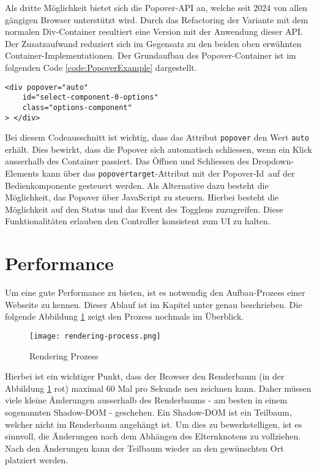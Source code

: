 Als dritte Möglichkeit bietet sich die Popover-API an, welche seit 2024 von allen gängigen Browser unterstützt wird.
Durch das Refactoring der Variante mit dem normalen Div-Container resultiert eine Version mit der Anwendung dieser API.
Der Zusatzaufwand reduziert sich im Gegensatz zu den beiden oben erwähnten Container-Implementationen.
Der Grundaufbau des Popover-Container ist im folgenden Code \ref{code:PopoverExample} dargestellt.

\begin{lstlisting}[style = htmlcssjs, caption = Popover-Container Beispiel, label = code:PopoverExample]
<div popover="auto"
    id="select-component-0-options" 
    class="options-component" 
> </div>
\end{lstlisting}

Bei diesem Codeausschnitt ist wichtig, dass das Attribut \texttt{popover} den Wert \texttt{auto} erhält.
Dies bewirkt, dass die Popover sich automatisch schliessen, wenn ein Klick ausserhalb des Container passiert.
Das Öffnen und Schliessen des Dropdown-Elements kann über das \texttt{popovertarget}-Attribut mit der Popover-Id\footnotemark \ auf der Bedienkomponente gesteuert werden.
Als Alternative dazu besteht die Möglichkeit, das Popover über JavaScript zu steuern.
Hierbei besteht die Möglichkeit auf den Status und das Event des Togglens zuzugreifen.
Diese Funktionalitäten erlauben den Controller konsistent zum UI zu halten.


\section{Performance}
\label{sec:performance}

Um eine gute Performance zu bieten, ist es notwendig den Aufbau-Prozess einer Webseite zu kennen.
Dieser Ablauf ist im Kapitel \textbf{} unter \textbf{} genau beschrieben.
Die folgende Abbildung \ref{img:RenderingProcessRecap} zeigt den Prozess nochmals im Überblick.

\begin{figure}[!htb]
    \centering
    \texttt{[image: rendering-process.png]}
    \caption{Rendering Prozess}
    \label{img:RenderingProcessRecap}
\end{figure}

Hierbei ist ein wichtiger Punkt, dass der Browser den Renderbaum (in der Abbildung \ref{img:RenderingProcessRecap} rot) maximal 60 Mal pro Sekunde neu zeichnen kann.
Daher müssen viele kleine Änderungen ausserhalb des Renderbaums - am besten in einem sogenannten Shadow-DOM - geschehen.
Ein Shadow-DOM ist ein Teilbaum, welcher nicht im Renderbaum angehängt ist.
Um dies zu bewerkstelligen, ist es sinnvoll, die Änderungen nach dem Abhängen des Elternknotens zu vollziehen. 
Nach den Änderungen kann der Teilbaum wieder an den gewünschten Ort platziert werden.


